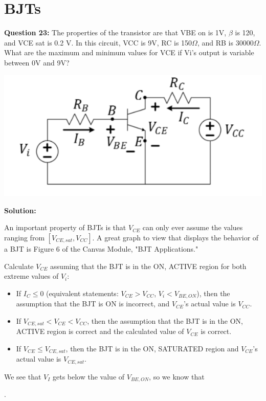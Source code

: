 \documentclass{article}
\begin{document}
\pagebreak

\section*{BJTs}
\textbf{Question 23:} The properties of the transistor are that VBE on is 1V, \(\beta\) is 120, and VCE sat is 0.2 V. In this circuit, VCC is 9V, RC is 150\(\Omega\), and RB is 30000\(\Omega\). What are the maximum and minimum values for VCE if Vi’s output is variable between 0V and 9V?

\begin{center}

    \includegraphics[width=0.75\linewidth]{figures/56.png}
\end{center}

\textbf{Solution:} 

An important property of BJTs is that $V_{CE}$ can only ever assume the values ranging from $[V_{CE,sat},V_{CC}]$. A great graph to view that displays the behavior of a BJT is Figure 6 of the Canvas Module, "BJT Applications."

Calculate $V_{CE}$ assuming that the BJT is in the ON, ACTIVE region for both extreme values of $V_i$:
\begin{itemize}
    \item If $I_C \le 0$ (equivalent statements: $V_{CE} > V_{CC}$, $V_i < V_{BE,ON}$), then the assumption that the BJT is ON is incorrect, and $V_{CE}$'s actual value is $V_{CC}$.
    \item If $V_{CE,sat} < V_{CE} < V_{CC}$, then the assumption that the BJT is in the ON, ACTIVE region is correct and the calculated value of $V_{CE}$ is correct.
    \item If $V_{CE} \le V_{CE,sat}$, then the BJT is in the ON, SATURATED region and $V_{CE}$'s actual value is $V_{CE,sat}$.
\end{itemize}

We see that $V_I$ gets below the value of $V_{BE,ON}$, so we know that
\begin{center}
    .
\end{center}
\end{document}
